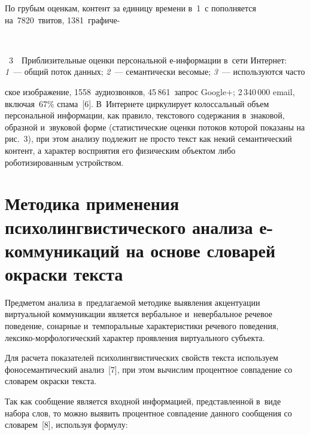 \begin{multicols}{2}
  По грубым оценкам, контент за единицу времени в~1~с пополняется 
на~7820~твитов, 1381~графиче-\linebreak\vspace*{-12pt}

 { \begin{center}  %
 \vspace*{6pt}
 \mbox{%
\epsfxsize=61.242mm
}

\end{center}


\noindent
{{\figurename~3}\ \ \small{Приблизительные оценки персональной е-ин\-фор\-ма\-ции в~сети Интернет: 
\textit{1}~--- общий поток данных; \textit{2}~---  семантически весомые; \textit{3}~--- 
используются часто}}

}


\addtocounter{figure}{1}



\noindent
ское изображение, 1558~аудиозвонков, 
45\,861~запрос Google+; 2\,340\,000 email, включая~67\% спама~[6]. 
В~Интернете циркулирует колоссальный объем персональной информации, как 
правило, текстового содержания в~знаковой, образной и~звуковой форме 
(статистические оценки потоков которой показаны на рис.~3), при этом 
анализу подлежит не просто текст как некий семантический контент, а характер 
восприятия его физическим объектом либо роботизированным устройством.


  
\section{Методика применения психолингвистического анализа  
е-коммуникаций на основе словарей окраски текста}

  Предметом анализа в~предлагаемой методике выявления акцентуации 
виртуальной коммуникации является вербальное и~невербальное речевое 
поведение, сонарные и~темпоральные характеристики речевого поведения,  
лек\-си\-ко-мор\-фо\-ло\-ги\-че\-ский характер проявления виртуального 
субъ\-екта. 

Для расчета показателей психолингвистических свойств текста 
используем фоносемантический анализ~[7], при этом вычислим процентное 
совпадение со словарем окраски текста.
  
  Так как сообщение является входной информацией, представленной в~виде 
набора слов, то можно выявить процентное совпадение данного сообщения со 
словарем~[8], используя формулу:


\end{multicols}
